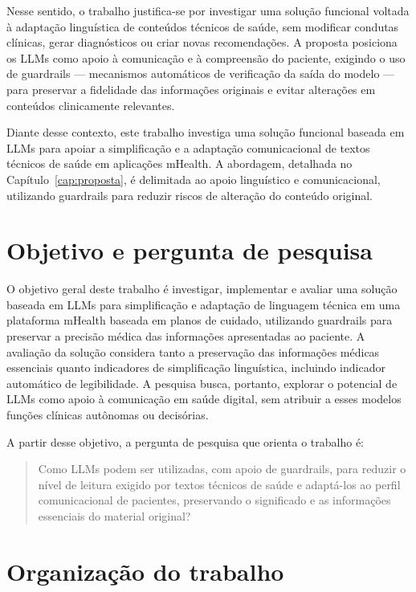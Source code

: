 Nesse sentido, o trabalho justifica-se por investigar uma solução funcional voltada à adaptação linguística de conteúdos técnicos de saúde, sem modificar condutas clínicas, gerar diagnósticos ou criar novas recomendações. A proposta posiciona os LLMs como apoio à comunicação e à compreensão do paciente, exigindo o uso de guardrails — mecanismos automáticos de verificação da saída do modelo — para preservar a fidelidade das informações originais e evitar alterações em conteúdos clinicamente relevantes.

Diante desse contexto, este trabalho investiga uma solução funcional baseada em LLMs para apoiar a simplificação e a adaptação comunicacional de textos técnicos de saúde em aplicações mHealth. A abordagem, detalhada no Capítulo~\ref{cap:proposta}, é delimitada ao apoio linguístico e comunicacional, utilizando guardrails para reduzir riscos de alteração do conteúdo original.

\section{Objetivo e pergunta de pesquisa}
\label{sec:objetivo-pergunta-pesquisa}

O objetivo geral deste trabalho é investigar, implementar e avaliar uma solução baseada em LLMs para simplificação e adaptação de linguagem técnica em uma plataforma mHealth baseada em planos de cuidado, utilizando guardrails para preservar a precisão médica das informações apresentadas ao paciente. A avaliação da solução considera tanto a preservação das informações médicas essenciais quanto indicadores de simplificação linguística, incluindo indicador automático de legibilidade. A pesquisa busca, portanto, explorar o potencial de LLMs como apoio à comunicação em saúde digital, sem atribuir a esses modelos funções clínicas autônomas ou decisórias.

A partir desse objetivo, a pergunta de pesquisa que orienta o trabalho é:

\begin{quote}
Como LLMs podem ser utilizadas, com apoio de guardrails, para reduzir o nível de leitura exigido por textos técnicos de saúde e adaptá-los ao perfil comunicacional de pacientes, preservando o significado e as informações essenciais do material original?
\end{quote}

\section{Organização do trabalho}
\label{sec:organizacao-trabalho}

